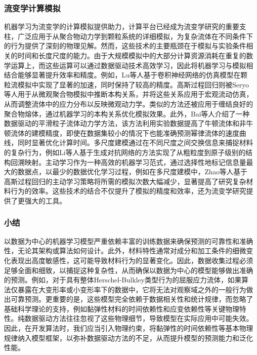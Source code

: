 \subsubsection{流变学计算模拟}
机器学习为流变学的计算模拟提供助力，计算平台已经成为流变学研究的重要支柱，广泛应用于从聚合物动力学到颗粒系统的详细模拟，为复杂流体在不同条件下的行为提供了深刻的物理见解。然而，这些技术的主要瓶颈在于模拟与实验条件相关的时间和长度尺度的能力。由于大规模模拟中的大部分计算资源消耗在重复的数学运算上，而这些运算可以通过数据驱动技术高效学习，因此将机器学习与模拟相结合能够显著提升效率和精度。例如，Lu等人基于卷积神经网络的仿真模型在颗粒流模拟中实现了显著的加速，同时保持了较高的精度\cite{lu2021machine}。高斯过程回归则被Seryo等人用于从微观聚合物模拟中推断本构关系，并将这些关系应用于宏观流动仿真，从而调整流体中的应力分布以反映微观动力学\cite{seryoLearningConstitutiveRelation2020}。类似的方法还被应用于缠结良好的聚合物熔体，通过机器学习的本构关系优化模拟效果。此外，Bai等人介绍了一种数据驱动的平滑粒子流体动力学方法，该方法利用实验数据提高了牛顿流体和非牛顿流体的建模精度，即使在数据集较小的情况下也能准确预测幂律流体的速度曲线，同时显著优化计算时间\cite{baiDatadrivenSmoothedParticle2021}。多尺度建模通过在不同尺度之间交换信息来捕捉材料的复杂行为，例如Li等人基于生成对抗网络的方法实现了从粗粒度到原子级别的结构回溯映射\cite{liBackmappingCoarsegrainedMacromolecules2020}。主动学习作为一种高效的机器学习范式，通过选择性地标记信息量最大的数据点，以最少的数据优化学习过程，例如在多尺度建模中，Zhao等人基于高斯过程回归的主动学习策略将所需的模拟次数大幅减少，显著提高了研究复杂材料行为的效率\cite{zhaoActiveLearningConstitutive2018}。这些技术的结合不仅提升了模拟的精度和效率，还为流变学研究提供了更强大的工具。

\subsubsection{小结}
以数据为中心的机器学习模型严重依赖丰富的训练数据来确保预测的可靠性和准确性，无论其架构或算法如何设计。此外，材料特性通常对成分和加工条件的细微变化表现出高度敏感性，这可能导致材料行为的显著变化。因此，数据收集过程必须足够全面和细致，以捕捉这种复杂性，从而确保以数据为中心的模型能够做出准确的预测。例如，对于具有整体Herschel-Bulkley类型行为的屈服应力流体，如果算法仅暴露在大变形率或小变形率下的数据中，它将无法对观察域之外的一般行为做出可靠预测\cite{mangalDatadrivenTechniquesRheology2025,saadatRheologistsGuidelineDatadriven2023,reyesLearningUnknownPhysics2021}。更重要的是，这些模型完全依赖于数据相关性和统计规律，而忽略了基础科学理论的支持，例如黏弹性材料的时间依赖性和应变依赖性等关键物理特性。纯数据驱动方法往往忽视了这些物理细节，导致模型在实际应用中可能失效。因此，在开发算法时，我们应当引入物理约束，将黏弹性的时间依赖性等基本物理规律纳入模型框架，以弥补数据驱动方法的不足，从而提升模型的预测能力和泛化性能。

